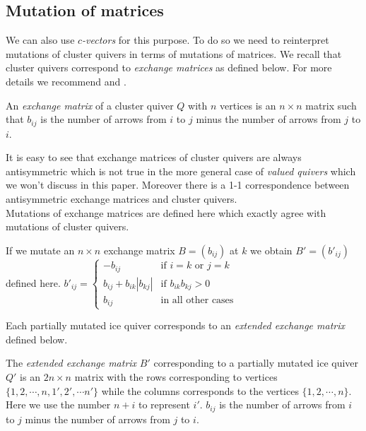 \subsection{Mutation of matrices}
\indent We can also use $c$\textit{-vectors} for this purpose. To do so we need to reinterpret mutations of cluster quivers in terms of mutations of matrices. We recall that cluster quivers correspond to \textit{exchange matrices} as defined below. For more details we recommend \cite{FZ01} and \cite{FZ06}.\\
\begin{definition}
\cite{FZ01} An \textit{exchange matrix} of a cluster quiver $Q$ with $n$ vertices is an $n\times n$ matrix such that $b_{ij}$ is the number of arrows from $i$ to $j$ minus the number of arrows from $j$ to $i$.
\end{definition}
\indent It is easy to see that exchange matrices of cluster quivers are always antisymmetric which is not true in the more general case of \textit{valued quivers} which we won't discuss in this paper. Moreover there is a 1-1 correspondence between antisymmetric exchange matrices and cluster quivers.\\
\indent Mutations of exchange matrices are defined here which exactly agree with mutations of cluster quivers.\\
\begin{definition}
\cite{FZ01} If we mutate an $n\times n$ exchange matrix $B = (b_{ij})$ at $k$ we obtain $B' = (b'_{ij})$ defined here.
$b'_{ij} = \begin{cases}
-b_{ij} & \text{if }i = k\text{ or }j = k\\
b_{ij} + b_{ik}|b_{kj}| & \text{if }b_{ik}b_{kj} > 0\\
b_{ij} & \text{in all other cases}
\end{cases}$
\end{definition}
\indent Each partially mutated ice quiver corresponds to an \textit{extended exchange matrix} defined below.\\
\begin{definition}
The \textit{extended exchange matrix} $B'$ corresponding to a partially mutated ice quiver $Q'$ is an $2n\times n$ matrix with the rows corresponding to vertices $\{1,2,\cdots, n, 1', 2',\cdots n'\}$ while the columns corresponds to the vertices $\{1,2,\cdots, n\}$. Here we use the number $n+i$ to represent $i'$. $b_{ij}$ is the number of arrows from $i$ to $j$ minus the number of arrows from $j$ to $i$.
\end{definition}
